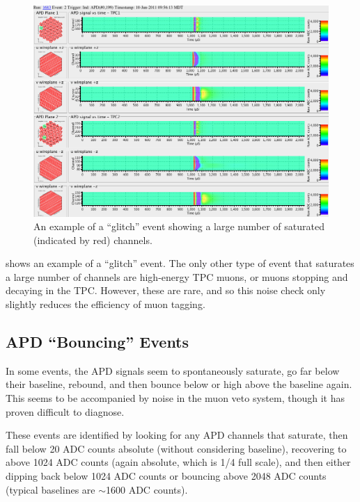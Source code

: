 \documentclass[herrin-thesis.tex]{subfiles}
\begin{document}
\begin{figure}[tbp]
\centering
\includegraphics[width=\columnwidth]{./plots/noise_eventdisplay_run_1683_ev_0002.png}
\caption[``Glitch'' noise]{An example of a ``glitch'' event showing a large number of saturated (indicated by red) channels.}
\label{fig:noise_glitch}
\end{figure}

 shows an example of a ``glitch'' event. The only other type of event that saturates a large number of channels are high-energy TPC muons, or  muons stopping and decaying in the TPC. However, these are rare, and so this noise check only slightly reduces the efficiency of muon tagging.

\subsection{APD ``Bouncing'' Events}
In some events, the APD signals seem to spontaneously saturate, go far below their baseline, rebound, and then bounce below or high above the baseline again. This seems to be accompanied by noise in the muon veto system, though it has proven difficult to diagnose.

These events are identified by looking for any APD channels that saturate, then fall below 20 ADC counts absolute (without considering baseline), recovering to above 1024 ADC counts (again absolute, which is 1/4 full scale), and then either dipping back below 1024 ADC counts or bouncing above 2048 ADC counts (typical baselines are \(\sim\)1600 ADC counts). 
\end{document}
